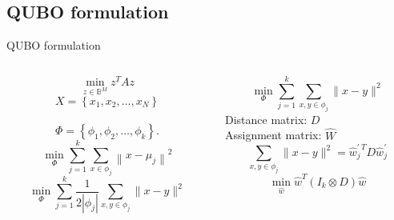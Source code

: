 \subsection{QUBO formulation}
	\begin{frame}{QUBO formulation}
		\begin{columns}
			\begin{column}{0.5\textwidth}
				$$\min _{z \in \mathbb{B}^{M}} z^{T} A z$$
				\pause
				$$X=\left\{x_{1}, x_{2}, \ldots, x_{N}\right\}$$\\$$\Phi=\left\{\phi_{1}, \phi_{2}, \ldots, \phi_{k}\right\} .$$
				\pause
				$$\min _{\Phi} \sum_{j=1}^{k} \sum_{x \in \phi_{j}}\left\|x-\mu_{j}\right\|^{2}$$
				\pause
				$$\min _{\Phi} \sum_{j=1}^{k} \frac{1}{2\left|\phi_{j}\right|} \sum_{x, y \in \phi_{j}}\|x-y\|^{2}$$
				\pause

			\end{column}
			\begin{column}{0.5\textwidth}  
				$$\min _{\Phi} \sum_{j=1}^{k} \sum_{x, y \in \phi_{j}}\|x-y\|^{2}$$
				\pause
				Distance matrix: $D$ \\Assignment matrix: $\hat W$
				\pause
				$$\sum_{x, y \in \phi_{j}}\|x-y\|^{2}=\hat{w}^{\prime \: T}_{j} D \hat{w}_{j}^{\prime}$$
				\pause
				$$\min _{\hat{w}} \hat{w}^{T}\left(I_{k} \otimes D\right) \hat{w}$$
			\end{column}
		\end{columns}
	\end{frame}

